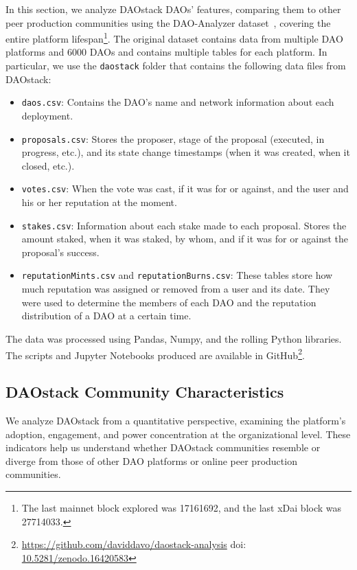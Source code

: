 \documentclass[10pt,lineno]{wlpeerj}
\begin{document}
In this section, we analyze DAOstack DAOs’ features, comparing them to other peer production communities using the DAO-Analyzer dataset~\citep{Arroyo2022}, covering the entire platform lifespan\footnote{The last mainnet block explored was 17161692, and the last xDai block was 27714033.}. The original dataset contains data from multiple DAO platforms and 6000 DAOs and contains multiple tables for each platform. In particular, we use the \texttt{daostack} folder that contains the following data files from DAOstack:

\begin{itemize}
    \item \texttt{daos.csv}: Contains the DAO's name and network information about each deployment.
    \item \texttt{proposals.csv}: Stores the proposer, stage of the proposal (executed, in progress, etc.), and its state change timestamps (when it was created, when it closed, etc.).
    \item \texttt{votes.csv}: When the vote was cast, if it was for or against, and the user and his or her reputation at the moment.
    \item \texttt{stakes.csv}: Information about each stake made to each proposal. Stores the amount staked, when it was staked, by whom, and if it was for or against the proposal's success.
    \item \texttt{reputationMints.csv} and \texttt{reputationBurns.csv}: These tables store how much reputation was assigned or removed from a user and its date. They were used to determine the members of each DAO and the reputation distribution of a DAO at a certain time.
\end{itemize}

The data was processed using Pandas, Numpy, and the rolling Python libraries. The scripts and Jupyter Notebooks produced are available in GitHub\footnote{\url{https://github.com/daviddavo/daostack-analysis} doi: \href{https://doi.org/10.5281/zenodo.16420583}{10.5281/zenodo.16420583}}.

\subsection{DAOstack Community Characteristics}
\label{subsec:dao_communities}

We analyze DAOstack from a quantitative perspective, examining the platform's adoption, engagement, and power concentration at the organizational level. These indicators help us understand whether DAOstack communities resemble or diverge from those of other DAO platforms or online peer production communities.
\end{document}
